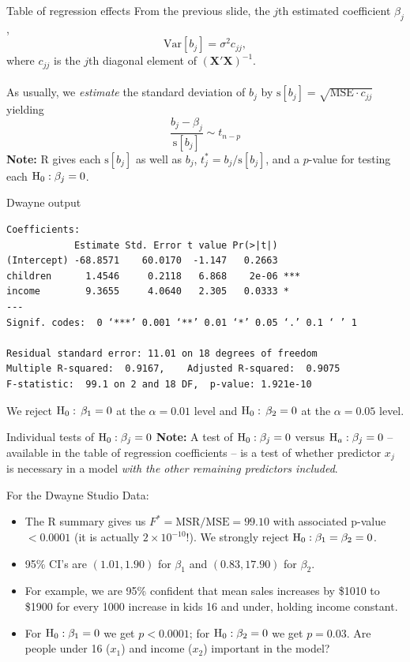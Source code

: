 \documentclass{beamer}
\newcommand{\Var}{\mathrm{Var}}
\newcommand{\s}{\mathrm{s}}
\begin{document}
\begin{frame}{Table of regression effects}
From the previous slide, the $j$th estimated coefficient $\beta_j$,
$$
\Var[b_j]=\sigma^2 c_{jj},
$$
where $c_{jj}$ is the $j$th diagonal element of $(\mathbf{X'X})^{-1}$.\\~\\ 

As usually, we {\it estimate} the standard deviation of $b_j$ by $\s[b_j]=\sqrt{\mathrm{MSE}\cdot c_{jj}}$ yielding
$$
\frac{b_j-\beta_j}{\s[b_j]}\sim t_{n-p}
$$
{\bf Note:} {\sc R} gives each $\s[b_j]$ as well as $b_j$, $t^\ast_j=b_j/\s[b_j]$, and a $p$-value for testing each ${\rm H}_0:\beta_j=0$.
\end{frame}

\begin{frame}[fragile]{Dwayne output}
\begin{footnotesize}
\begin{verbatim}
Coefficients:
            Estimate Std. Error t value Pr(>|t|)    
(Intercept) -68.8571    60.0170  -1.147   0.2663    
children      1.4546     0.2118   6.868    2e-06 ***
income        9.3655     4.0640   2.305   0.0333 *  
---
Signif. codes:  0 ‘***’ 0.001 ‘**’ 0.01 ‘*’ 0.05 ‘.’ 0.1 ‘ ’ 1

Residual standard error: 11.01 on 18 degrees of freedom
Multiple R-squared:  0.9167,	Adjusted R-squared:  0.9075 
F-statistic:  99.1 on 2 and 18 DF,  p-value: 1.921e-10
\end{verbatim}
\end{footnotesize}
We reject ${\rm H}_0:\,\beta_1=0$ at the $\alpha=0.01$ level and ${\rm H}_0:\,\beta_2=0$ at the $\alpha=0.05$ level.
\end{frame}

\begin{frame}{Individual tests of ${\rm H}_0: \beta_j=0$}
\textbf{Note:} A test of ${\rm H}_0: \beta_j=0$ versus ${\rm H}_a: \beta_j=0$ -- available in the table of regression coefficients -- is a test of whether predictor $x_j$ is necessary in a model \textit{with the other remaining predictors included}.
\vspace{10pt}

For the Dwayne Studio Data:
\begin{itemize}
\item<2-> The {\sc R} summary gives us $F^\ast=\mathrm{MSR}/\mathrm{MSE}=99.10$ with associated p-value $<0.0001$ (it is actually $2\times10^{-10}$!). We strongly reject ${\rm H}_0: \beta_1=\beta_2=0$.
\item<3-> 95\% CI's are $(1.01, 1.90)$ for $\beta_1$ and $(0.83, 17.90)$ for $\beta_2$.
\item<4-> For example, we are 95\% confident that mean sales increases by \$1010 to \$1900 for every 1000 increase in kids 16 and under, holding income constant.
\item<5-> For ${\rm H}_0: \beta_1=0$ we get $p<0.0001$; for ${\rm H}_0: \beta_2=0$ we get $p=0.03$. Are people under 16 ($x_1$) and income ($x_2$) important in the model?
\end{itemize}
\end{frame}
\end{document}
